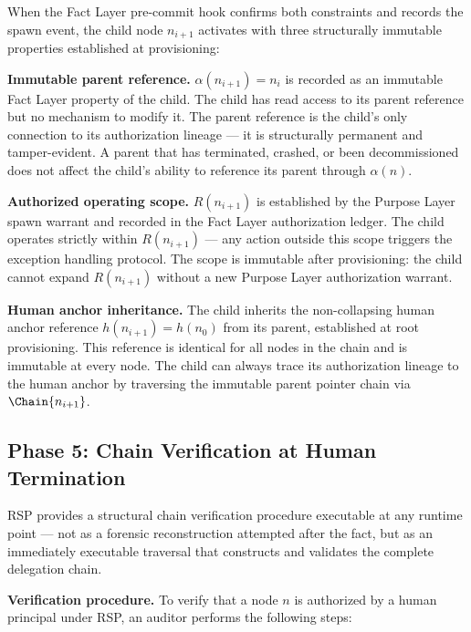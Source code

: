 When the Fact Layer pre-commit hook confirms both constraints and records the spawn event, the child node $n_{i+1}$ activates with three structurally immutable properties established at provisioning:

\medskip
\noindent\textbf{Immutable parent reference.} $\alpha(n_{i+1}) = n_i$ is recorded as an immutable Fact Layer property of the child. The child has read access to its parent reference but no mechanism to modify it. The parent reference is the child's only connection to its authorization lineage — it is structurally permanent and tamper-evident. A parent that has terminated, crashed, or been decommissioned does not affect the child's ability to reference its parent through $\alpha(n)$.

\medskip
\noindent\textbf{Authorized operating scope.} $R(n_{i+1})$ is established by the Purpose Layer spawn warrant and recorded in the Fact Layer authorization ledger. The child operates strictly within $R(n_{i+1})$ — any action outside this scope triggers the exception handling protocol. The scope is immutable after provisioning: the child cannot expand $R(n_{i+1})$ without a new Purpose Layer authorization warrant.

\medskip
\noindent\textbf{Human anchor inheritance.} The child inherits the non-collapsing human anchor reference $h(n_{i+1}) = h(n_0)$ from its parent, established at root provisioning. This reference is identical for all nodes in the chain and is immutable at every node. The child can always trace its authorization lineage to the human anchor by traversing the immutable parent pointer chain via $\Chain{n_{i+1}}$.

\subsection{Phase 5: Chain Verification at Human Termination}

RSP provides a structural chain verification procedure executable at any runtime point — not as a forensic reconstruction attempted after the fact, but as an immediately executable traversal that constructs and validates the complete delegation chain.

\medskip
\noindent\textbf{Verification procedure.} To verify that a node $n$ is authorized by a human principal under RSP, an auditor performs the following steps:

